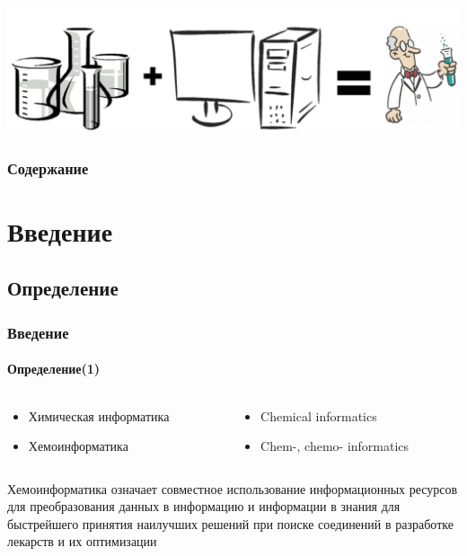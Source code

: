 



\thispagestyle{empty}

\begin{frame}
  \maketitle
  \begin{center}
  \includegraphics[scale=0.5]{images/title.png}
\end{center}
\end{frame}

\setcounter{page}{1}

\begin{frame}
  \frametitle{Содержание} 
  \tableofcontents
\end{frame}

\section{Введение}
\subsection{Определение}

\begin{frame}
  \frametitle{Введение}
  \framesubtitle{Определение(1)}

  \begin{columns}
    \begin{column}{0.5\textwidth}
       \begin{itemize}
         \item Химическая информатика
         \item Хемоинформатика
       \end{itemize}
    \end{column}
    \begin{column}{0.5\textwidth}
       \begin{itemize}
         \item Chemical informatics
         \item Chem-, chemo- informatics
       \end{itemize}
    \end{column}
  \end{columns}

  \begin{defn}[Ф.К.Браун, 1998]
     Хемоинформатика означает совместное использование информационных ресурсов для преобразования данных
     в информацию и информации в знания для быстрейшего принятия наилучших решений при поиске соединений
     в разработке лекарств и их оптимизации 
  \end{defn}

\end{frame}

